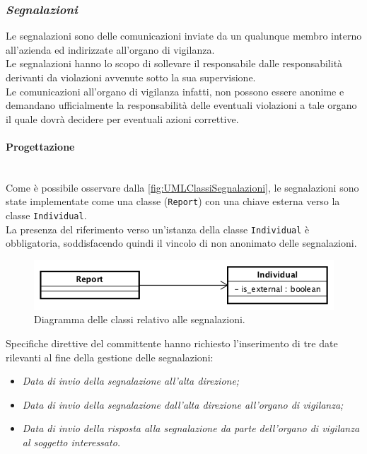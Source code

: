 \subsubsection{\textit{Segnalazioni}}
Le segnalazioni sono delle comunicazioni inviate da un qualunque membro interno all'azienda ed indirizzate all'organo di vigilanza.\\
Le segnalazioni hanno lo scopo di sollevare il responsabile dalle responsabilità derivanti da violazioni avvenute sotto la sua supervisione. \\
Le comunicazioni all'organo di vigilanza infatti, non possono essere anonime e demandano ufficialmente la responsabilità delle eventuali violazioni a tale organo il quale dovrà decidere per eventuali azioni correttive.
	
	\paragraph*{Progettazione}\mbox{} \\
	Come è possibile osservare dalla \autoref{fig:UMLClassiSegnalazioni}, le segnalazioni sono state implementate come una classe (\texttt{Report}) con una chiave esterna verso la classe \texttt{Individual}. \\
	La presenza del riferimento verso un'istanza della classe \texttt{Individual} è obbligatoria, soddisfacendo quindi il vincolo di non anonimato delle segnalazioni.\\
	\begin{figure}[H]
		\begin{center}
			\includegraphics[width=12cm]{Pics/UMLClassiSegnalazioni.png}
			\caption{Diagramma delle classi relativo alle segnalazioni.}
			\label{fig:UMLClassiSegnalazioni}
		\end{center}
	\end{figure}
	Specifiche direttive del committente hanno richiesto l'inserimento di tre date rilevanti al fine della gestione delle segnalazioni:
	\begin{itemize}
		\item \textit{Data di invio della segnalazione all'alta direzione;}
		\item \textit{Data di invio della segnalazione dall'alta direzione all'organo di vigilanza;}
		\item \textit{Data di invio della risposta alla segnalazione da parte dell'organo di vigilanza al soggetto interessato.}
	\end{itemize}
